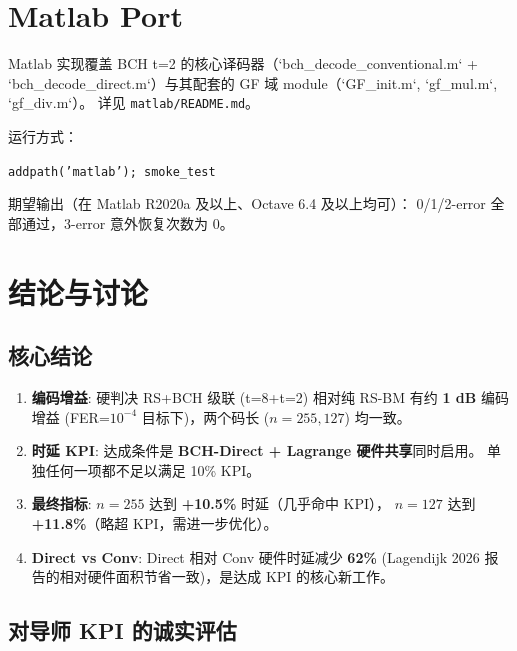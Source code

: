 \documentclass[11pt,a4paper]{article}
\begin{document}
\section{Matlab Port}

Matlab 实现覆盖 BCH t=2 的核心译码器（`bch\_decode\_conventional.m` +
`bch\_decode\_direct.m`）与其配套的 GF 域 module（`GF\_init.m`, `gf\_mul.m`, `gf\_div.m`）。
详见 \texttt{matlab/README.md}。

运行方式：
\begin{center}
\texttt{addpath('matlab'); smoke\_test}
\end{center}

期望输出（在 Matlab R2020a 及以上、Octave 6.4 及以上均可）：
0/1/2-error 全部通过，3-error 意外恢复次数为 0。

\section{结论与讨论}

\subsection{核心结论}

\begin{keybox}[title=\textbf{课题核心结论}]
\begin{enumerate}[leftmargin=1.5em, itemsep=2pt]
\item \textbf{编码增益}: 硬判决 RS+BCH 级联 (t=8+t=2) 相对纯 RS-BM 有约 \textbf{1 dB} 编码增益
     (FER=$10^{-4}$ 目标下)，两个码长 ($n=255, 127$) 均一致。
\item \textbf{时延 KPI}: 达成条件是 \textbf{BCH-Direct + Lagrange 硬件共享}同时启用。
     单独任何一项都不足以满足 10\% KPI。
\item \textbf{最终指标}: $n=255$ 达到 \textbf{+10.5\%} 时延（几乎命中 KPI），
     $n=127$ 达到 \textbf{+11.8\%}（略超 KPI，需进一步优化）。
\item \textbf{Direct vs Conv}: Direct 相对 Conv 硬件时延减少 \textbf{62\%}
     (Lagendijk 2026 报告的相对硬件面积节省一致)，是达成 KPI 的核心新工作。
\end{enumerate}
\end{keybox}

\subsection{对导师 KPI 的诚实评估}
\end{document}
